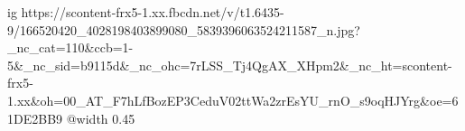  
 
 
 
 

\ifcmt
  ig https://scontent-frx5-1.xx.fbcdn.net/v/t1.6435-9/166520420_4028198403899080_5839396063524211587_n.jpg?_nc_cat=110&ccb=1-5&_nc_sid=b9115d&_nc_ohc=7rLSS_Tj4QgAX_XHpm2&_nc_ht=scontent-frx5-1.xx&oh=00_AT_F7hLfBozEP3CeduV02ttWa2zrEsYU_rnO_s9oqHJYrg&oe=61DE2BB9
  @width 0.45
\fi
